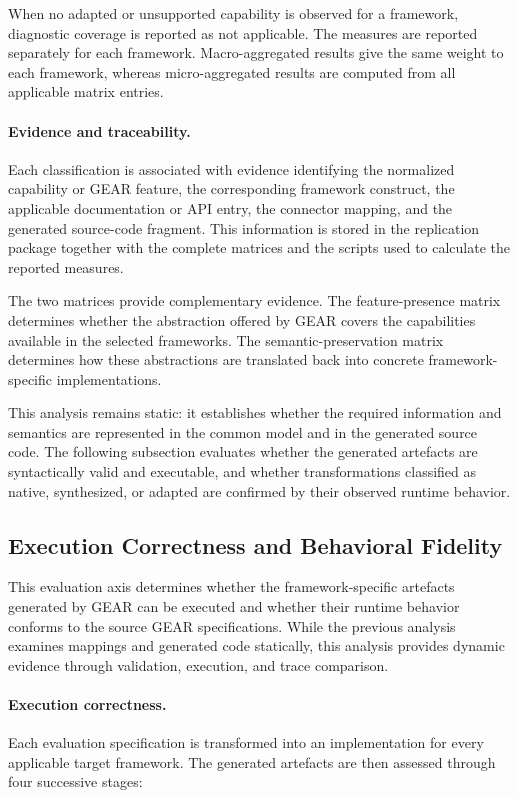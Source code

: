 When no adapted or unsupported capability is observed for a framework,
diagnostic coverage is reported as not applicable. The measures are reported
separately for each framework. Macro-aggregated results give the same weight
to each framework, whereas micro-aggregated results are computed from all
applicable matrix entries.

\paragraph{Evidence and traceability.}

Each classification is associated with evidence identifying the normalized
capability or GEAR feature, the corresponding framework construct, the
applicable documentation or API entry, the connector mapping, and the
generated source-code fragment. This information is stored in the
replication package together with the complete matrices and the scripts used
to calculate the reported measures.

The two matrices provide complementary evidence. The feature-presence matrix
determines whether the abstraction offered by GEAR covers the capabilities
available in the selected frameworks. The semantic-preservation matrix
determines how these abstractions are translated back into concrete
framework-specific implementations.

This analysis remains static: it establishes whether the required
information and semantics are represented in the common model and in the
generated source code. The following subsection evaluates whether the
generated artefacts are syntactically valid and executable, and whether
transformations classified as native, synthesized, or adapted are confirmed
by their observed runtime behavior.

\subsection{Execution Correctness and Behavioral Fidelity}
\label{subsec:execution-behavior}

This evaluation axis determines whether the framework-specific artefacts generated
by GEAR can be executed and whether their runtime behavior conforms to the source
GEAR specifications. While the previous analysis examines mappings and generated
code statically, this analysis provides dynamic evidence through validation,
execution, and trace comparison.

\paragraph{Execution correctness.}
Each evaluation specification is transformed into an implementation for every
applicable target framework. The generated artefacts are then assessed through
four successive stages:

